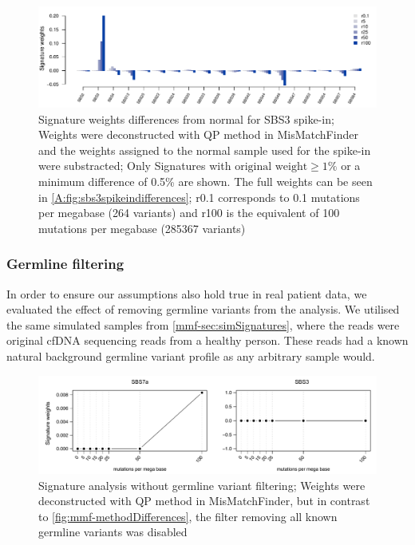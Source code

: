 \begin{figure}[ht]
\centering
\includegraphics[width=.99\linewidth]{Figures/MisMatchFinder/SBS3SpikeInSignatureDifferencesFocussed.pdf}
\caption[Signature weights differences from normal for SBS3 spike-in]{Signature weights differences from normal for SBS3 spike-in; Weights were deconstructed with QP method in MisMatchFinder and the weights assigned to the normal sample used for the spike-in were substracted; Only Signatures with $\text{original weight}\geq 1\%$ or a minimum difference of 0.5\% are shown. The full weights can be seen in \protect\autoref{A:fig:sbs3spikeindifferences}; r0.1 corresponds to 0.1 mutations per megabase (264 variants) and r100 is the equivalent of 100 mutations per megabase (285367 variants)}\label{fig:mmf-spikeSBS3signatures}
\end{figure}

\subsubsection{Germline filtering}
\label{mmf-sec:germlinefiltering}
In order to ensure our assumptions also hold true in real patient data, we evaluated the effect of removing germline variants from the analysis. We utilised the same simulated samples from \autoref{mmf-sec:simSignatures}, where the reads were original cfDNA sequencing reads from a healthy person. These reads had a known natural background germline variant profile as any arbitrary sample would.

\begin{figure}[ht]
\centering
\includegraphics[width=.99\linewidth]{Figures/MisMatchFinder/noGermlineFilterAnalysis.pdf}
\caption[Signature analysis without germline variant filtering]{Signature analysis without germline variant filtering; Weights were deconstructed with QP method in MisMatchFinder, but in contrast to \protect\autoref{fig:mmf-methodDifferences}, the filter removing all known germline variants was disabled}\label{fig:mmf-noGermlineFilterAnalysis}
\end{figure}

